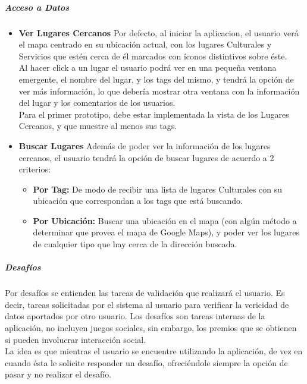 \documentclass[10pt,letterpaper]{article}
\begin{document}
\subparagraph{Acceso a Datos}
\begin{itemize}
 \item \textbf{Ver Lugares Cercanos} Por defecto, al iniciar la aplicacion, el usuario verá el mapa centrado en su ubicación actual, con los lugares Culturales y Servicios que estén cerca de él marcados con íconos distintivos sobre éste.\\

Al hacer click a un lugar el usuario podrá ver en una pequeña ventana emergente, el nombre del lugar, y los tags del mismo, y tendrá la opción de ver más información, lo que debería mostrar otra ventana con la información del lugar y los comentarios de los usuarios.\\

Para el primer prototipo, debe estar implementada la vista de los Lugares Cercanos, y que muestre al menos sus tags.\\

 \item \textbf{Buscar Lugares} Además de poder ver la información de los lugares cercanos, el usuario tendrá la opción de buscar lugares de acuerdo a 2 criterios:\\

\begin{itemize}
\item \textbf{Por Tag:} De modo de recibir una lista de lugares Culturales con su ubicación que correspondan a los tags que está buscando.
\item \textbf{Por Ubicación:} Buscar una ubicación en el mapa (con algún método a determinar que provea el mapa de Google Maps), y poder ver los lugares de cualquier tipo que hay cerca de la dirección buscada.
\end{itemize}
\end{itemize}

\subparagraph{Desafíos}

Por desafíos se entienden las tareas de validación que realizará el usuario. Es decir, tareas solicitadas por el sistema al usuario para verificar la vericidad de datos aportados por otro usuario. Los desafíos son tareas internas de la aplicación, no incluyen juegos sociales, sin embargo, los premios que se obtienen si pueden involucrar interacción social.\\

La idea es que mientras el usuario se encuentre utilizando la aplicación, de vez en cuando ésta le solicite responder un desafío, ofreciéndole siempre la opción de pasar y no realizar el desafío.\\
\end{document}

